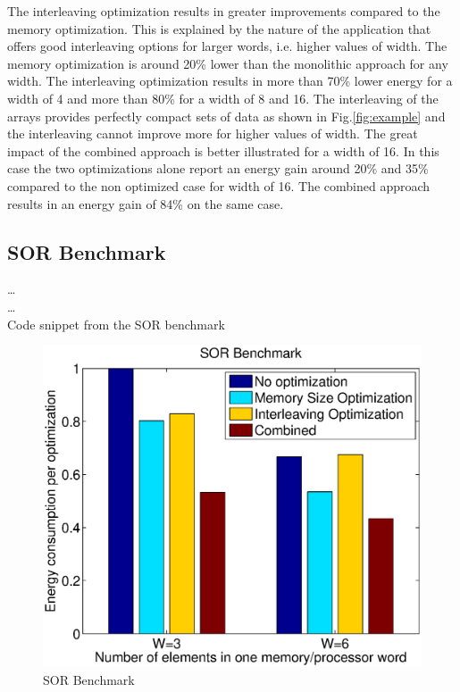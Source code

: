 \documentclass[prodmode,acmtecs]{acmsmall}
\begin{document}
The interleaving optimization results in greater improvements compared to the memory optimization.
This is explained by the nature of the application that offers good interleaving options for larger words, i.e. higher values of width.
The memory optimization is around 20\% lower than the monolithic approach for any width.
The interleaving optimization results in more than 70\% lower energy for a width of 4 and more than 80\% for a width of 8 and 16.
The interleaving of the arrays provides perfectly compact sets of data as shown in Fig.\ref{fig:example} and the interleaving cannot improve more for higher values of width.
The great impact of the combined approach is better illustrated for a width of 16. 
In this case the two optimizations alone report an energy gain around 20\% and 35\% compared to the non optimized case for width of 16.
The combined approach results in an energy gain of 84\% on the same case.

\subsection{SOR Benchmark}

\begin{algorithm}[t]
\SetAlgoNoLine
\ldots \\
{}	
 \ldots \\		
\caption{Code snippet from the SOR benchmark}
\label{alg:sor}
\end{algorithm}

\begin{figure}
\centering
	\includegraphics[scale = 0.5]{Images/sor.eps} 
	\caption{SOR Benchmark}
	\label{fig:sor}
\end{figure}
\end{document}
